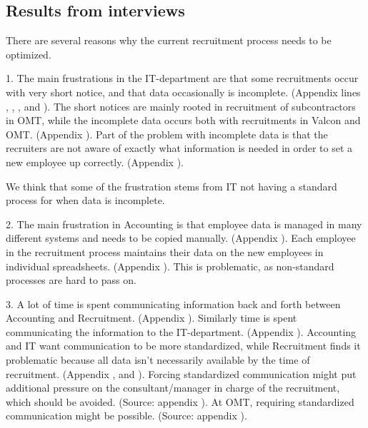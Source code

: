 \subsection{Results from interviews}
There are several reasons why the current recruitment process needs to be optimized.

1. The main frustrations in the IT-department are that some recruitments occur with very short notice, and that data occasionally is incomplete.
(Appendix  lines , , , and ).
The short notices are mainly rooted in recruitment of subcontractors in OMT, while the incomplete data occurs both with recruitments in Valcon and OMT.
(Appendix ).
Part of the problem with incomplete data is that the recruiters are not aware of exactly what information is needed in order to set a new employee up correctly.
(Appendix ).

We think that some of the frustration stems from IT not having a standard process for when data is incomplete.

2. The main frustration in Accounting is that employee data is managed in many different systems and needs to be copied manually.
(Appendix ).
Each employee in the recruitment process maintains their data on the new employees in individual spreadsheets.
(Appendix ).
This is problematic, as non-standard processes are hard to pass on.

3. A lot of time is spent communicating information back and forth between Accounting and Recruitment.
(Appendix ).
Similarly time is spent communicating the information to the IT-department.
(Appendix ).
Accounting and IT want communication to be more standardized, while Recruitment finds it problematic because all data isn't necessarily available by the time of recruitment.
(Appendix ,  and ).
Forcing standardized communication might put additional pressure on the consultant/manager in charge of the recruitment, which should be avoided.
(Source: appendix ).
At OMT, requiring standardized communication might be possible.
(Source: appendix ).

